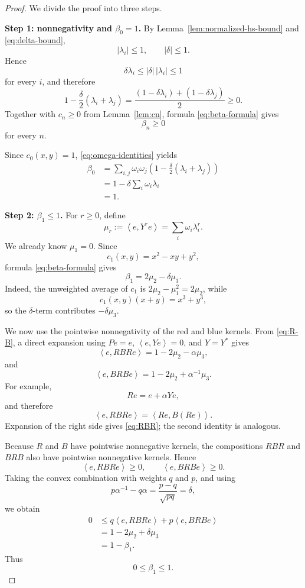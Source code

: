 \documentclass[11pt]{article}
\newcommand{\ip}[2]{\left\langle #1,#2\right\rangle}
\begin{document}
\begin{proof}
We divide the proof into three steps.

\medskip
\noindent\textbf{Step 1: nonnegativity and $\beta_0=1$.}
By Lemma~\ref{lem:normalized-hs-bound} and \eqref{eq:delta-bound},
\[
   |\lambda_i|\le1,
   \qquad
   |\delta|\le1.
\]
Hence
\[
   \delta\lambda_i\le |\delta|\,|\lambda_i|\le1
\]
for every $i$, and therefore
\begin{equation}
   1-\frac{\delta}{2}(\lambda_i+\lambda_j)
   =\frac{(1-\delta\lambda_i)+(1-\delta\lambda_j)}{2}
   \ge0.
   \label{eq:weight-positive}
\end{equation}
Together with $c_n\ge0$ from Lemma~\ref{lem:cn}, formula \eqref{eq:beta-formula} gives
\[
   \beta_n\ge0
\]
for every $n$.

Since $c_0(x,y)=1$, \eqref{eq:omega-identities} yields
\begin{align*}
   \beta_0
   &=\sum_{i,j}\omega_i\omega_j
      \left(1-\frac{\delta}{2}(\lambda_i+\lambda_j)\right)\\
   &=1-\delta\sum_i\omega_i\lambda_i\\
   &=1.
\end{align*}

\medskip
\noindent\textbf{Step 2: $\beta_1\le1$.}
For $r\ge0$, define
\[
   \mu_r:=\ip{e}{Y^r e}=\sum_i\omega_i\lambda_i^r.
\]
We already know $\mu_1=0$.  Since
\[
   c_1(x,y)=x^2-xy+y^2,
\]
formula \eqref{eq:beta-formula} gives
\begin{equation}
   \beta_1=2\mu_2-\delta\mu_3.
   \label{eq:beta1}
\end{equation}
Indeed, the unweighted average of $c_1$ is $2\mu_2-\mu_1^2=2\mu_2$, while
\[
   c_1(x,y)(x+y)=x^3+y^3,
\]
so the $\delta$-term contributes $-\delta\mu_3$.

We now use the pointwise nonnegativity of the red and blue kernels.  From \eqref{eq:R-B}, a direct expansion using $Pe=e$, $\ip{e}{Ye}=0$, and $Y=Y^*$ gives
\begin{equation}
   \ip{e}{RBR e}=1-2\mu_2-\alpha\mu_3,
   \label{eq:RBR}
\end{equation}
and
\begin{equation}
   \ip{e}{BRB e}=1-2\mu_2+\alpha^{-1}\mu_3.
   \label{eq:BRB}
\end{equation}
For example,
\[
   Re=e+\alpha Ye,
\]
and therefore
\[
   \ip{e}{RBR e}=\ip{Re}{B(Re)}.
\]
Expansion of the right side gives \eqref{eq:RBR}; the second identity is analogous.

Because $R$ and $B$ have pointwise nonnegative kernels, the compositions $RBR$ and $BRB$ also have pointwise nonnegative kernels.  Hence
\[
   \ip{e}{RBR e}\ge0,
   \qquad
   \ip{e}{BRB e}\ge0.
\]
Taking the convex combination with weights $q$ and $p$, and using
\[
   p\alpha^{-1}-q\alpha
   =\frac{p-q}{\sqrt{pq}}
   =\delta,
\]
we obtain
\begin{align*}
 0
 &\le q\ip{e}{RBR e}+p\ip{e}{BRB e}\\
 &=1-2\mu_2+\delta\mu_3\\
 &=1-\beta_1.
\end{align*}
Thus
\[
   0\le\beta_1\le1.
\]


\end{proof}
\end{document}
